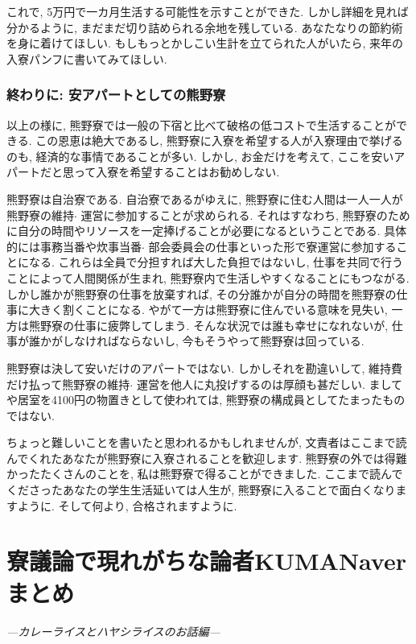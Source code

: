 \documentclass[10pt,b5jsbook,dvips,dvipdfmx,openany]{jsbook}
\theoremstyle{definition}
\begin{document}
	これで, 5万円で一カ月生活する可能性を示すことができた. しかし詳細を見れば分かるように, まだまだ切り詰められる余地を残している. あなたなりの節約術を身に着けてほしい. もしもっとかしこい生計を立てられた人がいたら, 来年の入寮パンフに書いてみてほしい. 

			\subsubsection{終わりに: 安アパートとしての熊野寮}
			以上の様に, 熊野寮では一般の下宿と比べて破格の低コストで生活することができる. この恩恵は絶大であるし, 熊野寮に入寮を希望する人が入寮理由で挙げるのも, 経済的な事情であることが多い. しかし, お金だけを考えて, ここを安いアパートだと思って入寮を希望することはお勧めしない. 
			
		熊野寮は自治寮である. 自治寮であるがゆえに, 熊野寮に住む人間は一人一人が熊野寮の維持$ \cdot $ 運営に参加することが求められる. それはすなわち, 熊野寮のために自分の時間やリソースを一定捧げることが必要になるということである. 具体的には事務当番や炊事当番$ \cdot $ 部会委員会の仕事といった形で寮運営に参加することになる. これらは全員で分担すれば大した負担ではないし, 仕事を共同で行うことによって人間関係が生まれ, 熊野寮内で生活しやすくなることにもつながる. しかし誰かが熊野寮の仕事を放棄すれば, その分誰かが自分の時間を熊野寮の仕事に大きく割くことになる. やがて一方は熊野寮に住んでいる意味を見失い, 一方は熊野寮の仕事に疲弊してしまう. そんな状況では誰も幸せになれないが, 仕事が誰かがしなければならないし, 今もそうやって熊野寮は回っている. 
		
		熊野寮は決して安いだけのアパートではない. しかしそれを勘違いして, 維持費だけ払って熊野寮の維持$ \cdot $ 運営を他人に丸投げするのは厚顔も甚だしい. ましてや居室を4100円の物置きとして使われては, 熊野寮の構成員としてたまったものではない. 

		ちょっと難しいことを書いたと思われるかもしれませんが, 文責者はここまで読んでくれたあなたが熊野寮に入寮されることを歓迎します. 熊野寮の外では得難かったたくさんのことを, 私は熊野寮で得ることができました. ここまで読んでくださったあなたの学生生活延いては人生が, 熊野寮に入ることで面白くなりますように. そして何より, 合格されますように. 
		




	\section{寮議論で現れがちな論者KUMANaverまとめ} %
	\emph{---カレーライスとハヤシライスのお話編---}
\end{document}

